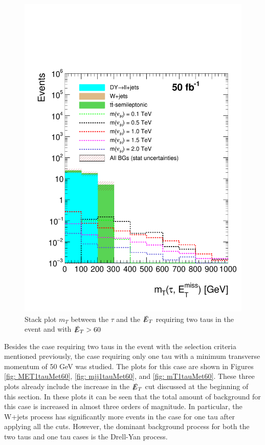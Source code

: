 \begin{figure}[H]
\centering
\includegraphics[width=\linewidth]{StackPlots/mT_2Tau_met60_50ifb_2moreSignals.pdf}
\caption{Stack plot $m_{T}$ between the $\tau$ and the $\slashed{E}_{T}$ requiring two taus in the event and with $\slashed{E}_{T} > 60$}
\label{fig: mT2tausMet60}
\end{figure}



Besides the case requiring two taus in the event with the selection criteria mentioned previously, the case requiring only one tau with a minimum transverse momentum of 50 GeV was studied. The plots for this case are shown in Figures \ref{fig: MET1tauMet60}, \ref{fig: mjj1tauMet60}, and \ref{fig: mT1tauMet60}. These three plots already include the increase in the $\slashed{E}_{T}$ cut discussed at the beginning of this section. In these plots it can be seen that the total amount of background for this case is increased in almost three orders of magnitude. In particular, the W+jets process has significantly more events in the case for one tau after applying all the cuts. However, the dominant background process for both the two taus and one tau cases is the Drell-Yan process. 

